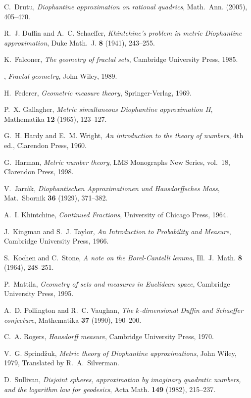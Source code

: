 \documentclass[reqno]{amsart}
\newcommand{\0}{{\mathbf{0}}}
\begin{document}
\begin{thebibliography}{10}
C.~Drutu, \emph{Diophantine approximation on rational quadrics}, Math.\ Ann.
  (2005), 405--470.

R.~J. Duffin and A.~C. Schaeffer, \emph{Khintchine's problem in metric
  {D}iophantine approximation}, Duke Math.\ J. \textbf{8} (1941), 243--255.

K.~Falconer, \emph{The geometry of fractal sets}, Cambridge University Press,
  1985.

\bysame, \emph{Fractal geometry}, John Wiley, 1989.

H.~Federer, \emph{Geometric measure theory}, Springer-Verlag, 1969.

P.~X. Gallagher, \emph{Metric simultaneous {D}iophantine approximation {II}},
  Mathematika \textbf{12} (1965), 123--127.

G.~H. Hardy and E.~M. Wright, \emph{An introduction to the theory of numbers},
  4th ed., Clarendon Press, 1960.

G.~Harman, \emph{Metric number theory}, LMS Monographs New Series, vol.~18,
  Clarendon Press, 1998.

V.~Jarn{\'\i}k, \emph{Diophantischen {A}pproximationen und {H}ausdorff\-sches
  {M}ass}, Mat.\ Sbornik \textbf{36} (1929), 371--382.

A.~I. Khintchine, \emph{Continued {F}ractions}, University of Chicago Press,
  1964.

J.~Kingman and S.~J. Taylor, \emph{An {I}ntroduction to {P}robability and
  {M}easure}, Cambridge University Press, 1966.

S.~Kochen and C.~Stone, \emph{A note on the {B}orel-{C}antelli lemma}, Ill.\
  J.\ Math. \textbf{8} (1964), 248--251.

P.~Mattila, \emph{Geometry of sets and measures in {E}uclidean space},
  Cambridge University Press, 1995.

A.~D. Pollington and R.~C. Vaughan, \emph{The $k$-dimensional {D}uffin and
  {S}chaeffer conjecture}, Mathematika \textbf{37} (1990), 190--200.

C.~A. Rogers, \emph{Hausdorff measure}, Cambridge University Press, 1970.

V.~G. Sprind{\v z}uk, \emph{Metric theory of {D}iophantine approximations},
  John Wiley, 1979, Translated by R.~A.~Silverman.

D.~Sullivan, \emph{Disjoint spheres, approximation by imaginary quadratic
  numbers, and the logarithm law for geodesics}, Acta Math. \textbf{149}
  (1982), 215--237.

\end{thebibliography}
\end{document}
